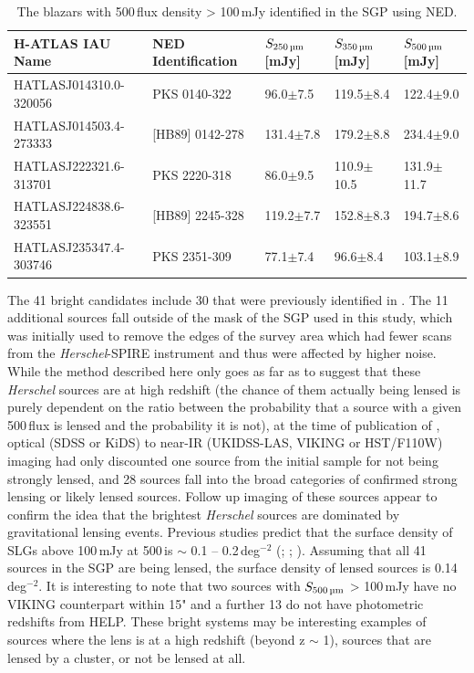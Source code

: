\begin{table}
    \centering
    \begin{tabular}{p{4.5cm}|p{3cm}|p{1.75cm}|p{1.75cm}|p{1.75cm}}
        \hline
        \hline
        H-ATLAS IAU Name & NED Identification & $S_{\textrm{250\,\micron}}$ [mJy] & $S_{\textrm{350\,\micron}}$ [mJy] & $S_{\textrm{500\,\micron}}$ [mJy] \\
        \hline
        \hline
        HATLASJ014310.0-320056 & PKS 0140-322 & 96.0$\pm$7.5 & 119.5$\pm$8.4 & 122.4$\pm$9.0 \\
        HATLASJ014503.4-273333 & [HB89] 0142-278 & 131.4$\pm$7.8 & 179.2$\pm$8.8 & 234.4$\pm$9.0 \\
        HATLASJ222321.6-313701 & PKS 2220-318 & 86.0$\pm$9.5 & 110.9$\pm$10.5 & 131.9$\pm$11.7 \\
        HATLASJ224838.6-323551 & [HB89] 2245-328 & 119.2$\pm$7.7 & 152.8$\pm$8.3 & 194.7$\pm$8.6 \\
        HATLASJ235347.4-303746 & PKS 2351-309 & 77.1$\pm$7.4 & 96.6$\pm$8.4 & 103.1$\pm$8.9 \\
        \hline
    \end{tabular}
    \caption{The blazars with 500\,\micron flux density > 100\,mJy identified in the SGP using NED.}
    \label{tab:blazars}
\end{table}

The 41 bright candidates include 30 that were previously identified in \citealt{Negrello_2017}. The 11 additional sources fall outside of the mask of the SGP used in this study, which was initially used to remove the edges of the survey area which had fewer scans from the \textit{Herschel}-SPIRE instrument and thus were affected by higher noise. While the method described here only goes as far as to suggest that these \textit{Herschel} sources are at high redshift (the chance of them actually being lensed is purely dependent on the ratio between the probability that a source with a given 500\,\micron flux is lensed and the probability it is not), at the time of publication of \citealt{Negrello_2017}, optical (SDSS or KiDS) to near-IR (UKIDSS-LAS, VIKING or HST/F110W) imaging had only discounted one source from the initial sample for not being strongly lensed, and 28 sources fall into the broad categories of confirmed strong lensing or likely lensed sources. Follow up imaging of these sources appear to confirm the idea that the brightest \textit{Herschel} sources are dominated by gravitational lensing events. Previous studies predict that the surface density of SLGs above 100\,mJy at 500\,\micron is $\sim$ 0.1 -- 0.2\,deg$^{-2}$ (\citealt{Vieira_2010}; \citealt{Wardlow_2013}; \citealt{Nayyeri_2016}). Assuming that all 41 sources in the SGP are being lensed, the surface density of lensed sources is 0.14\,deg$^{-2}$. It is interesting to note that two sources with $S_{\textrm{500\,\micron}}$ > 100\,mJy have no VIKING counterpart within 15" and a further 13 do not have photometric redshifts from HELP. These bright systems may be interesting examples of sources where the lens is at a high redshift (beyond z $\sim$ 1), sources that are lensed by a cluster, or not be lensed at all.

